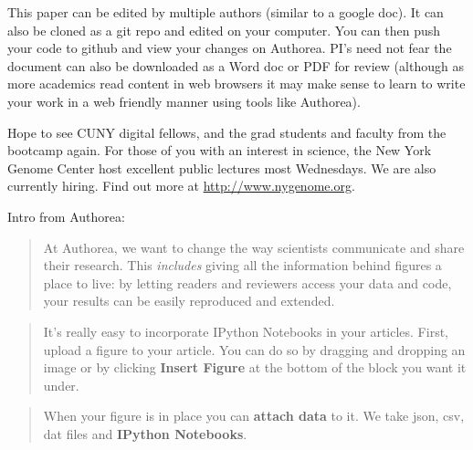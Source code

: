 This paper can be edited by multiple authors (similar to a google doc). It can also be cloned as a git repo and edited on your computer. You can then push your code to github and view your changes on Authorea. PI's need not fear the document can also be downloaded as a Word doc or PDF for review (although as more academics read content in web browsers it may make sense to learn to write your work in a web friendly manner using tools like Authorea).

Hope to see CUNY digital fellows, and the grad students and faculty from the bootcamp again. For those of you with an interest in science, the New York Genome Center host excellent public lectures most Wednesdays. We are also currently hiring. Find out more at \href{http://}{http://www.nygenome.org}.

Intro from Authorea: 
\begin{quote}
At Authorea, we want to change the way scientists communicate and share their research. This \textit{includes} giving all the information behind figures a place to live: by letting readers and reviewers access your data and code, your results can be easily reproduced and extended.
\end{quote}

\begin{quote}
It's really easy to incorporate IPython Notebooks in your articles.  First, upload a figure to your article. You can do so by dragging and dropping an image or by clicking \textbf{Insert Figure} at the bottom of the block you want it under.  
\end{quote}

\begin{quote}
When your figure is in place you can \textbf{attach data} to it. We take json, csv, dat files and \textbf{IPython Notebooks}. 
\end{quote}